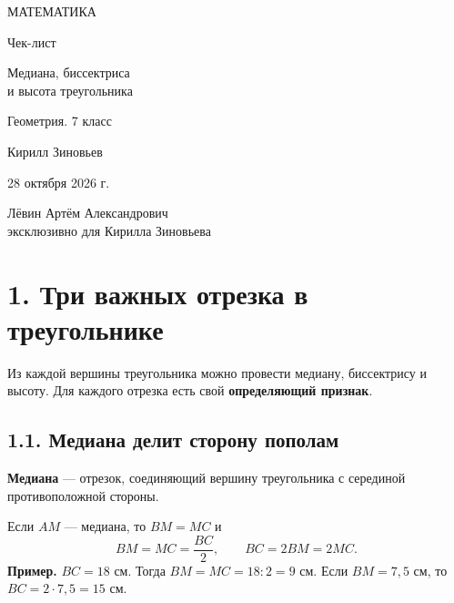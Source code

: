 \documentclass[a4paper,12pt]{article}
\newcommand{\sectionline}{\par\vspace{-3mm}{\color{accent}\hrule height .5pt}\vspace{4mm}}
\newcommand{\key}[1]{\textcolor{darkaccent}{\textbf{#1}}}
\begin{document}
\begin{titlepage}
\thispagestyle{empty}
\begin{center}
\vspace*{22mm}
{\color{darkaccent}\large МАТЕМАТИКА}\par
\vspace{15mm}
{\LARGE Чек-лист}\par
\vspace{13mm}
{\color{accent}\LARGE Медиана, биссектриса\\[2mm] и высота треугольника}\par
\vspace{13mm}
{\normalsize Геометрия. 7 класс}\par
\vfill
{\large Кирилл Зиновьев}\par
\vspace{12mm}
{28 октября 2026 г.}\par
\vspace{20mm}
{\small Лёвин Артём Александрович\\ эксклюзивно для Кирилла Зиновьева}\par
\vspace{14mm}
\end{center}
\end{titlepage}
\setcounter{page}{1}

\section*{1. Три важных отрезка в треугольнике}
\sectionline
Из каждой вершины треугольника можно провести медиану, биссектрису и высоту. Для каждого отрезка есть свой \key{определяющий признак}.

\subsection*{1.1. Медиана делит сторону пополам}
\key{Медиана} --- отрезок, соединяющий вершину треугольника с серединой противоположной стороны.

\begin{center}
\end{center}
Если $AM$ --- медиана, то $BM=MC$ и
\[
BM=MC=\frac{BC}{2},\qquad BC=2BM=2MC.
\]
\key{Пример.} $BC=18$ см. Тогда $BM=MC=18:2=9$ см. Если $BM=7{,}5$ см, то $BC=2\cdot7{,}5=15$ см.
\end{document}
